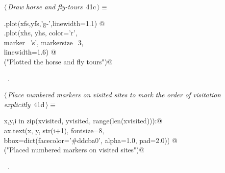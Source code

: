 \documentclass[11.5pt]{report}
\begin{document}
\begin{flushleft} \small
\begin{minipage}{\linewidth}\label{scrap55}\raggedright\small
{} $\langle\,${\itshape Draw horse and fly-tours}\nobreak\ {\footnotesize {41c}}$\,\rangle\equiv$
\vspace{-1ex}
\begin{list}{}{} \item
\mbox{}\verb@ax.plot(xfs,yfs,'g-',linewidth=1.1)  @\\
\mbox{}\verb@ax.plot(xhs, yhs, color='r', \@\\
\mbox{}\verb@        marker='s', markersize=3, \@\\
\mbox{}\verb@        linewidth=1.6) @\\
\mbox{}\verb@debug("Plotted the horse and fly tours")@\\
\mbox{}\verb@@{\NWsep}
\end{list}
\vspace{-1.5ex}
\footnotesize
\begin{list}{}{\setlength{\itemsep}{-\parsep}\setlength{\itemindent}{-\leftmargin}}
\item \NWtxtMacroRefIn\ .

\item{}
\end{list}
\end{minipage}\vspace{4ex}
\end{flushleft}

\begin{flushleft} \small\label{scrap56}\raggedright\small
{} $\langle\,${\itshape Place numbered markers on visited sites to mark the order of visitation explicitly}\nobreak\ {\footnotesize {41d}}$\,\rangle\equiv$
\vspace{-1ex}
\begin{list}{}{} \item
\mbox{}\verb@for x,y,i in zip(xvisited, yvisited, range(len(xvisited))):@\\
\mbox{}\verb@     ax.text(x, y, str(i+1),  fontsize=8, \@\\
\mbox{}\verb@             bbox=dict(facecolor='#ddcba0', alpha=1.0, pad=2.0)) @\\
\mbox{}\verb@debug("Placed numbered markers on visited sites")@\\
\mbox{}\verb@@{\NWsep}
\end{list}
\vspace{-1.5ex}
\footnotesize
\begin{list}{}{\setlength{\itemsep}{-\parsep}\setlength{\itemindent}{-\leftmargin}}
\item \NWtxtMacroRefIn\ .

\item{}
\end{list}
\vspace{4ex}
\end{flushleft}
\end{document}
